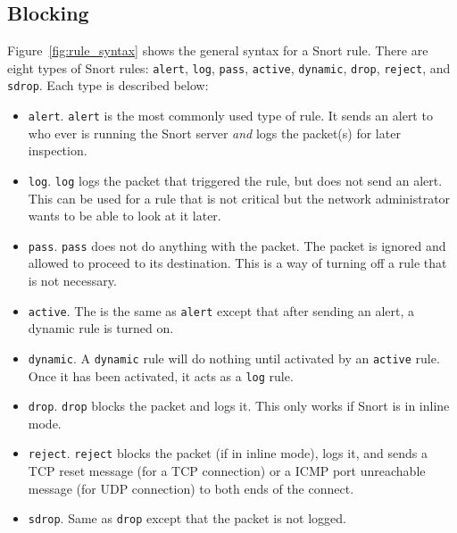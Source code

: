 
\subsection{Blocking}

Figure~\ref{fig:rule_syntax} shows the general syntax for a Snort rule. There are eight types of Snort rules: \texttt{alert}, \texttt{log}, \texttt{pass}, \texttt{active}, \texttt{dynamic}, \texttt{drop}, \texttt{reject}, and \texttt{sdrop}. Each type is described below:

\begin{itemize}
    \item \texttt{alert}.
        \texttt{alert} is the most commonly used type of rule. It sends an
        alert to who ever is running the Snort server \emph{and} logs the
        packet(s) for later inspection.

    \item \texttt{log}.
        \texttt{log} logs the packet that triggered the rule, but does not send
        an alert. This can be used for a rule that is not critical but the
        network administrator wants to be able to look at it later.

    \item \texttt{pass}.
        \texttt{pass} does not do anything with the packet. The packet is
        ignored and allowed to proceed to its destination. This is a way of 
        turning off a rule that is not necessary.

    \item \texttt{active}.  The is the same as \texttt{alert} except that after
        sending an alert, a dynamic rule is turned on.

    \item \texttt{dynamic}.  A \texttt{dynamic} rule will do nothing until
        activated by an \texttt{active} rule. Once it has been activated, it
        acts as a \texttt{log} rule.

    \item \texttt{drop}.  \texttt{drop} blocks the packet and logs it. This
        only works if Snort is in inline mode.

    \item \texttt{reject}.
        \texttt{reject} blocks the packet (if in inline mode), logs it, and
        sends a TCP reset message (for a TCP connection) or a ICMP port
        unreachable message (for UDP connection) to both ends of the connect.

    \item \texttt{sdrop}.
        Same as \texttt{drop} except that the packet is not logged.
\end{itemize}

